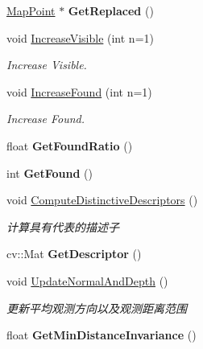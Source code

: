 \begin{DoxyCompactItemize}
\item 
\hypertarget{classORB__SLAM2_1_1MapPoint_ad8814ed8121bd730c640c620ed623baf}{\hyperlink{classORB__SLAM2_1_1MapPoint}{Map\-Point} $\ast$ {\bfseries Get\-Replaced} ()}\label{classORB__SLAM2_1_1MapPoint_ad8814ed8121bd730c640c620ed623baf}

\item 
void \hyperlink{classORB__SLAM2_1_1MapPoint_a0a234f5bd6bc19a9ea55fad0c9e6db5f}{Increase\-Visible} (int n=1)
\begin{DoxyCompactList}\small\item\em Increase Visible. \end{DoxyCompactList}\item 
void \hyperlink{classORB__SLAM2_1_1MapPoint_aa097cd8cf993a54e999f297e05729392}{Increase\-Found} (int n=1)
\begin{DoxyCompactList}\small\item\em Increase Found. \end{DoxyCompactList}\item 
\hypertarget{classORB__SLAM2_1_1MapPoint_ac1b7c69a2d9f6bd785d465380844ce10}{float {\bfseries Get\-Found\-Ratio} ()}\label{classORB__SLAM2_1_1MapPoint_ac1b7c69a2d9f6bd785d465380844ce10}

\item 
\hypertarget{classORB__SLAM2_1_1MapPoint_a0d081d56b0f398c52581b3e0eaa1cb15}{int {\bfseries Get\-Found} ()}\label{classORB__SLAM2_1_1MapPoint_a0d081d56b0f398c52581b3e0eaa1cb15}

\item 
void \hyperlink{classORB__SLAM2_1_1MapPoint_ab4c3dfd8f5f05a4b1888021f1fac3d84}{Compute\-Distinctive\-Descriptors} ()
\begin{DoxyCompactList}\small\item\em 计算具有代表的描述子 \end{DoxyCompactList}\item 
\hypertarget{classORB__SLAM2_1_1MapPoint_a8f9faa5b4cc513795485dcfb460ea3d0}{cv\-::\-Mat {\bfseries Get\-Descriptor} ()}\label{classORB__SLAM2_1_1MapPoint_a8f9faa5b4cc513795485dcfb460ea3d0}

\item 
void \hyperlink{classORB__SLAM2_1_1MapPoint_ac5b8e4ec6a7737860af57058bdd16124}{Update\-Normal\-And\-Depth} ()
\begin{DoxyCompactList}\small\item\em 更新平均观测方向以及观测距离范围 \end{DoxyCompactList}\item 
\hypertarget{classORB__SLAM2_1_1MapPoint_aac7224845c1d39016c50dcaacc0ebe40}{float {\bfseries Get\-Min\-Distance\-Invariance} ()}\label{classORB__SLAM2_1_1MapPoint_aac7224845c1d39016c50dcaacc0ebe40}


\end{DoxyCompactItemize}
